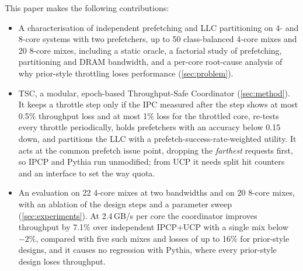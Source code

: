 This paper makes the following contributions:
\begin{itemize}
  \item A characterisation of independent prefetching and LLC partitioning on 4- and 8-core systems with two
        prefetchers, up to 50 class-balanced 4-core mixes and 20 8-core mixes, including a static oracle, a factorial study
        of prefetching, partitioning and DRAM bandwidth, and a per-core root-cause analysis of why prior-style
        throttling loses performance (\cref{sec:problem}).
  \item TSC, a modular, epoch-based Throughput-Safe Coordinator (\cref{sec:method}).  It keeps a throttle step only
        if the IPC measured after the step shows at most 0.5\% throughput loss and at most 1\% loss for the throttled core,
        re-tests every throttle periodically, holds prefetchers with an accuracy below 0.15 down, and partitions the
        LLC with a prefetch-success-rate-weighted utility.  It acts at the common prefetch issue point, dropping the
        \emph{farthest} requests first, so IPCP and Pythia run unmodified; from UCP it needs split hit counters and an
        interface to set the way quota.
  \item An evaluation on 22 4-core mixes at two bandwidths and on 20 8-core mixes, with an ablation of the design
        steps and a parameter sweep (\cref{sec:experiments}).  At 2.4\,GB/s per core the coordinator improves
        throughput by 7.1\% over independent IPCP+UCP with a single mix below $-2\%$, compared with five such mixes
        and losses of up to 16\% for prior-style designs, and it causes no regression with Pythia, where every
        prior-style design loses throughput.
\end{itemize}
